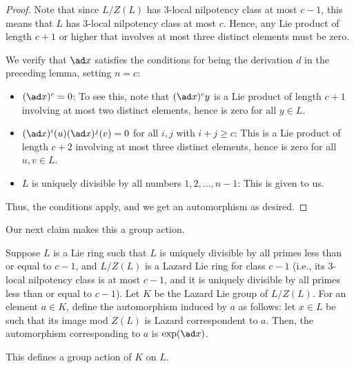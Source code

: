 \begin{proof}
  Note that since $L/Z(L)$ has $3$-local nilpotency class at most $c -
  1$, this means that $L$ has $3$-local nilpotency class at most
  $c$. Hence, any Lie product of length $c + 1$ or higher that
  involves at most three distinct elements must be zero.

  We verify that $\ad x$ satisfies the conditions for being the
  derivation $d$ in the preceding lemma, setting $n = c$:

  \begin{itemize}
  \item $(\ad x)^c = 0$: To see this, note that $(\ad x)^cy$ is a Lie
    product of length $c + 1$ involving at most two distinct elements,
    hence is zero for all $y \in L$.
  \item $(\ad x)^i(u)(\ad x)^j(v) = 0$ for all $i,j$ with $i + j \ge
    c$: This is a Lie product of length $c + 2$ involving at most
    three distinct elements, hence is zero for all $u,v \in L$.
  \item $L$ is uniquely divisible by all numbers $1,2,\dots,n - 1$:
    This is given to us.
  \end{itemize}

  Thus, the conditions apply, and we get an automorphism as desired.
\end{proof}

Our next claim makes this a group action.

\begin{lemma}
  Suppose $L$ is a Lie ring such that $L$ is uniquely divisible by all
  primes less than or equal to $c - 1$, and $L/Z(L)$ is a Lazard Lie
  ring for class $c - 1$ (i.e., its $3$-local nilpotency class is at
  most $c - 1$, and it is uniquely divisible by all primes less than
  or equal to $c - 1$). Let $K$ be the Lazard Lie group of
  $L/Z(L)$. For an element $a \in K$, define the automorphism induced
  by $a$ as follows: let $x \in L$ be such that its image mod $Z(L)$
  is Lazard correspondent to $a$. Then, the automorphism corresponding
  to $a$ is $\exp(\ad x)$.

  This defines a group action of $K$ on $L$.
\end{lemma}

